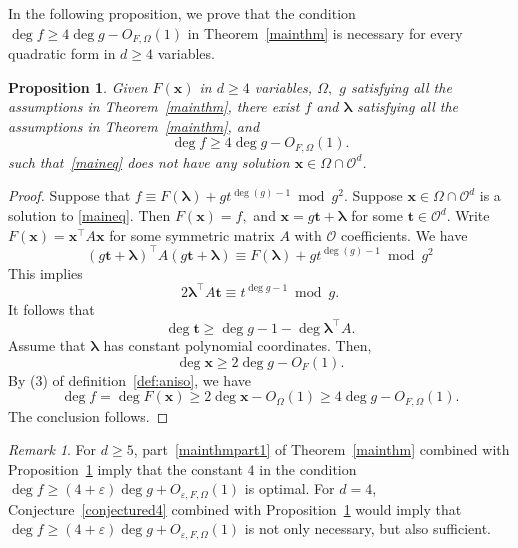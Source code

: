 \documentclass[10pt]{amsart}
\theoremstyle{plain}
\theoremstyle{plain}
\newtheorem{proposition}[theorem]{Proposition}
\renewcommand{\vec}[1]{\mathbf{#1}}
\theoremstyle{remark}
\newtheorem{remark}[equation]{Remark}
\theoremstyle{definition}
\begin{document}
In the following proposition, we prove that the condition $\deg f\geq 4\deg g-O_{F,\Omega}(1)$ in Theorem~\ref{mainthm} is necessary for every quadratic form in $d\geq 4$ variables.
\begin{proposition}\label{optimality} Given $F(\vec{x})$ in $d\geq 4$ variables, $\Omega,$ $g$ satisfying all the assumptions in Theorem~\ref{mainthm}, there exist $f$ and $\boldsymbol{\lambda}$ satisfying all the assumptions in Theorem~\ref{mainthm}, and 
\[
\deg f \geq 4\deg g - O_{F,\Omega}(1).
\]
such that~\eqref{maineq} does not have any solution $\vec{x}\in  \Omega\cap\mathcal{O}^d $. 
\end{proposition}
\begin{proof}
Suppose that $f\equiv F(\boldsymbol{\lambda})+gt^{\deg(g)-1} \bmod g^2.$  Suppose $\vec{x}\in  \Omega\cap\mathcal{O}^d $ is a solution to \eqref{maineq}. Then  $F(\vec{x})=f,$ and   $\vec{x}=g\vec{t}+ \boldsymbol{\lambda}$ for some $\vec{t}\in \mathcal{O}^d$. Write $F(\vec{x})= \vec{x}^{\intercal} A \vec{x}$ for some symmetric matrix $A$ with $\mathcal{O}$ coefficients. We have 
\[
(g\vec{t}+ \boldsymbol{\lambda})^{\intercal}A(g\vec{t}+ \boldsymbol{\lambda}) \equiv F(\boldsymbol{\lambda})+gt^{\deg(g)-1} \bmod g^2
\]
This implies 
\[
2\boldsymbol{\lambda}^{\intercal}A\vec{t}\equiv t^{\deg{g}-1} \bmod g.
\]
It follows that 
\[
\deg{\vec{t}} \geq \deg{g}-1-\deg{\boldsymbol{\lambda}^{\intercal}A}.
\]
Assume that $\boldsymbol{\lambda}$ has constant polynomial coordinates. Then,
\[
\deg\vec{x}\geq 2 \deg{g}- O_{F}(1).
\]
By (3) of definition~\ref{def:aniso}, we have 
\[
\deg{f}=\deg{F(\vec{x})} \geq 2\deg\vec{x}-O_{\Omega}(1)\geq 4 \deg{g}- O_{F,\Omega}(1).
\]
The conclusion follows.
\end{proof}
\begin{remark} 
For $d\geq 5$, part~\eqref{mainthmpart1} of Theorem~\ref{mainthm} combined with Proposition~\ref{optimality} imply that the constant $4$ in the condition $\deg f\geq (4+\varepsilon)\deg g+O_{\varepsilon,F,\Omega}(1)$ is optimal. For $d=4$, Conjecture~\ref{conjectured4} combined with Proposition~\ref{optimality} would imply that $\deg f\geq (4+\varepsilon)\deg g+O_{\varepsilon,F,\Omega}(1)$ is not only necessary, but also sufficient.
\end{remark}
\end{document}
